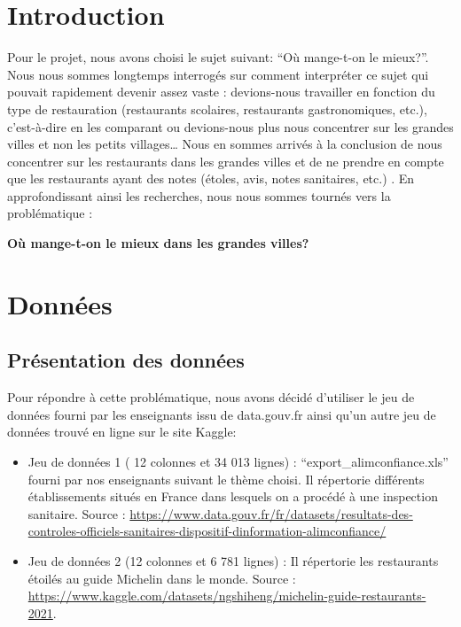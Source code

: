\documentclass[mstat,12pt]{unswthesis}
\begin{document}
\hypertarget{introduction}{%
\chapter{Introduction}\label{introduction}}

Pour le projet, nous avons choisi le sujet suivant: ``Où mange-t-on le
mieux?''. Nous nous sommes longtemps interrogés sur comment interpréter
ce sujet qui pouvait rapidement devenir assez vaste : devions-nous
travailler en fonction du type de restauration (restaurants scolaires,
restaurants gastronomiques, etc.), c'est-à-dire en les comparant ou
devions-nous plus nous concentrer sur les grandes villes et non les
petits villages\ldots{} Nous en sommes arrivés à la conclusion de nous
concentrer sur les restaurants dans les grandes villes et de ne prendre
en compte que les restaurants ayant des notes (étoles, avis, notes
sanitaires, etc.) . En approfondissant ainsi les recherches, nous nous
sommes tournés vers la problématique :

\bigskip

\centering

\textbf{Où mange-t-on le mieux dans les grandes villes?}

\bigskip

\hypertarget{donnuxe9es}{%
\chapter{Données}\label{donnuxe9es}}

\hypertarget{pruxe9sentation-des-donnuxe9es}{%
\section{Présentation des
données}\label{pruxe9sentation-des-donnuxe9es}}

\justifying

Pour répondre à cette problématique, nous avons décidé d'utiliser le jeu
de données fourni par les enseignants issu de data.gouv.fr ainsi qu'un
autre jeu de données trouvé en ligne sur le site Kaggle:

\begin{itemize}
\item
  Jeu de données 1 ( 12 colonnes et 34 013 lignes) :
  ``export\_alimconfiance.xls'' fourni par nos enseignants suivant le
  thème choisi. Il répertorie différents établissements situés en France
  dans lesquels on a procédé à une inspection sanitaire. Source :
  \url{https://www.data.gouv.fr/fr/datasets/resultats-des-controles-officiels-sanitaires-dispositif-dinformation-alimconfiance/}
\item
  Jeu de données 2 (12 colonnes et 6 781 lignes) : Il répertorie les
  restaurants étoilés au guide Michelin dans le monde. Source :
  \url{https://www.kaggle.com/datasets/ngshiheng/michelin-guide-restaurants-2021}.
\end{itemize}
\end{document}

